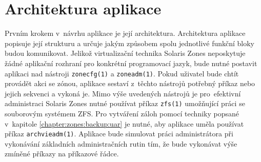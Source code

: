 \section{Architektura aplikace}
\label{chapter:design:architecture}
Prvním krokem v~návrhu aplikace je její architektura. Architektura aplikace popisuje její strukturu a určuje jakým způsobem
spolu jednotlivé funkční bloky budou komunikovat. Jelikož virtualizační technika Solaris Zones neposkytuje žádné aplikační rozhraní pro konkrétní
programovací jazyk, bude nutné postavit aplikaci nad nástroji \verb|zonecfg(1)| a \verb|zoneadm(1)|. Pokud uživatel bude chtít
provádět akci se zónou, aplikace sestaví z~těchto nástrojů potřebný příkaz nebo jejich sekvenci a vykoná je. Mimo výše
uvedených nástrojů je pro~efektivní administraci Solaris Zones nutné používat příkaz \verb|zfs(1)| umožňující práci se souborovým
systémem ZFS. Pro vytváření záloh pomocí techniky popsané v~kapitole \ref{chapter:zones:backup:uar} je nutné, aby aplikace uměla
používat příkaz \verb|archvieadm(1)|. Aplikace bude simulovat práci administrátora při vykonávání základních administračních
rutin tím, že bude vykonávat výše zmíněné příkazy na příkazové řádce.

